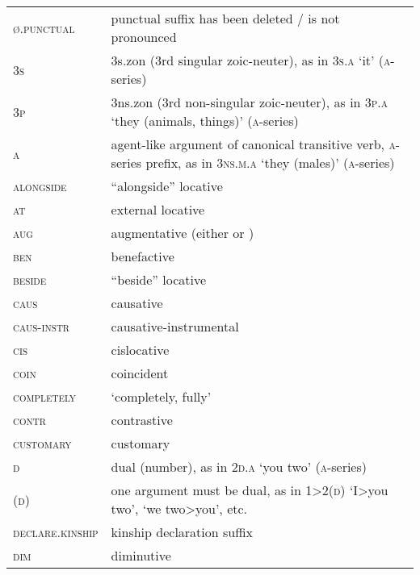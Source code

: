 
\begin{tabularx}{\textwidth}{lQ}
\textsc{ø.punctual} & punctual suffix has been deleted / is not pronounced\\
\textsc{3s}	&	3s.zon (3rd singular zoic-neuter), as in \textsc{3s.a} ‘it’ (\textsc{a}-series)  \\
\textsc{3p}	&	3ns.zon	(3rd non-singular zoic-neuter), as in \textsc{3p.a} ‘they (animals, things)’ (\textsc{a}-series) \\
\textsc{a}	&	agent-like argument of canonical transitive verb, \textsc{a}-series prefix, as in \textsc{3ns.m.a} ‘they (males)’ (\textsc{a}-series)  \\
\textsc{alongside}           &       “alongside” locative         \\
\textsc{at}           &       external locative               \\
\textsc{aug}             &      augmentative (either  or )      \\
\textsc{ben}             &      benefactive                           \\
\textsc{beside}          &       “beside” locative              \\
\textsc{caus}            &      causative                             \\
\textsc{caus-instr}      &      causative-instrumental                \\
\textsc{cis}             &      cislocative                           \\
\textsc{coin}            &      coincident                            \\
\textsc{completely} &	 ‘completely, fully’ \\
\textsc{contr}            &      contrastive                           \\
\textsc{customary}             &      customary            \\
\textsc{d}	&	dual (number), as in \textsc{2d.a} ‘you two’ (\textsc{a}-series)  \\
\textsc{(d)}	&	one argument must be dual, as in \textsc{1>2(d)} ‘I>you two’, ‘we two>you’, etc.   \\
\textsc{declare.kinship}		&	 kinship declaration suffix \\
\textsc{dim}             &      diminutive                            \\

\end{tabularx}
